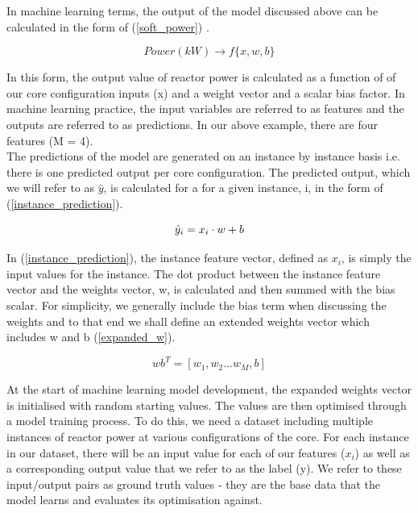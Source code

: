 \noindent
In machine learning terms, the output of the model discussed above can be calculated in the form of (\ref{soft_power}) .

\begin{equation} \label{soft_power}
	Power(kW)  \rightarrow f\{x, w, b\}
\end{equation}

\noindent
In this form, the output value of reactor power is calculated as a function of of our core configuration inputs (x) and a weight vector and a scalar bias factor. In machine learning practice, the input variables are referred to as features and the outputs are referred to as predictions. In our above example, there are four features (M = 4). \\

\noindent
The predictions of the model are generated on an instance by instance basis i.e. there is one predicted output per core configuration. The predicted output, which we will refer to as $\hat{y}$, is calculated for a for a given instance, i, in the form of (\ref{instance_prediction}).

\begin{equation} \label{instance_prediction}
	\hat{y}_i = x_i \space \cdot \space w + b
\end{equation}

\noindent 
In (\ref{instance_prediction}), the instance feature vector, defined as $x_i$, is simply the input values for the instance. The dot product between the instance feature vector and the weights vector, w, is calculated and then summed with the bias scalar.  For simplicity, we generally include the bias term when discussing the weights and to that end we shall define an extended weights vector which includes w and b (\ref{expanded_w}).

\begin{equation} \label{expanded_w}
	wb^T = [w_1, w_2 ... w_M, b]
\end{equation}

\noindent
At the start of machine learning model development, the expanded weights vector is initialised with random starting values. The values are then optimised through a model training process. To do this, we need a dataset including multiple instances of reactor power at various configurations of the core. For each instance in our dataset, there will be an input value for each of our features ($x_i$) as well as a corresponding output value that we refer to as the label (y). We refer to these input/output pairs as ground truth values - they are the base data that the model learns and evaluates its optimisation against.
\\

